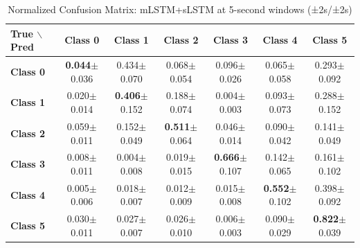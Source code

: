 \begin{table}[htbp]
\centering
\caption{Normalized Confusion Matrix: mLSTM+sLSTM at 5-second windows (±2s/±2s)}
\label{tab:app_cm_combined_5s}
\small
\setlength{\tabcolsep}{2pt}
\begin{tabular}{lcccccc}
	\toprule
	\textbf{True $\backslash$ Pred} & \textbf{Class 0} & \textbf{Class 1} & \textbf{Class 2} & \textbf{Class 3} & \textbf{Class 4} & \textbf{Class 5} \\
\midrule
	\textbf{Class 0} & \textbf{0.044}$\pm$0.036 & 0.434$\pm$0.070 & 0.068$\pm$0.054 & 0.096$\pm$0.026 & 0.065$\pm$0.058 & 0.293$\pm$0.092 \\
	\textbf{Class 1} & 0.020$\pm$0.014 & \textbf{0.406}$\pm$0.152 & 0.188$\pm$0.074 & 0.004$\pm$0.003 & 0.093$\pm$0.073 & 0.288$\pm$0.152 \\
	\textbf{Class 2} & 0.059$\pm$0.011 & 0.152$\pm$0.049 & \textbf{0.511}$\pm$0.064 & 0.046$\pm$0.014 & 0.090$\pm$0.042 & 0.141$\pm$0.049 \\
	\textbf{Class 3} & 0.008$\pm$0.011 & 0.004$\pm$0.008 & 0.019$\pm$0.015 & \textbf{0.666}$\pm$0.107 & 0.142$\pm$0.065 & 0.161$\pm$0.102 \\
	\textbf{Class 4} & 0.005$\pm$0.006 & 0.018$\pm$0.007 & 0.012$\pm$0.009 & 0.015$\pm$0.008 & \textbf{0.552}$\pm$0.102 & 0.398$\pm$0.092 \\
	\textbf{Class 5} & 0.030$\pm$0.011 & 0.027$\pm$0.007 & 0.026$\pm$0.010 & 0.006$\pm$0.003 & 0.090$\pm$0.029 & \textbf{0.822}$\pm$0.039 \\
\bottomrule
\end{tabular}
\setlength{\tabcolsep}{6pt}
\end{table}

